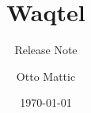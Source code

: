 \documentclass[Waqtel]{../../data/TelemacDoc} %
\begin{document}
\let\cleardoublepage\clearpage

\title{Waqtel}
\subtitle{Release Note}
\version{\telmaversion}
\author{Otto Mattic}
\date{\today}
\maketitle
\clearpage



\newpage

\thispagestyle{empty}

\TelemacCopyright{}




\pagestyle{empty} %

\tableofcontents%


\pagestyle{fancy} %
\cite{Hervouet2007}



\end{document}

